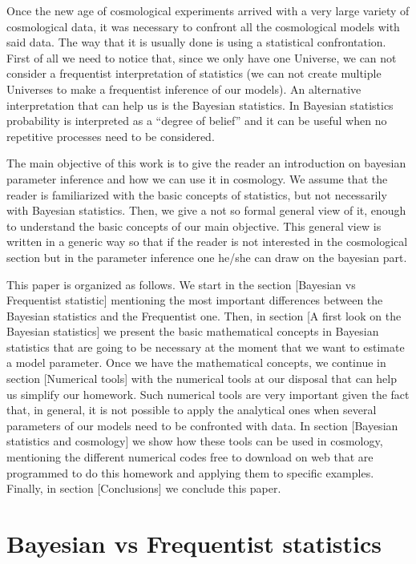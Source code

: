 \documentclass[onecolumn,           %
               showpacs,            %
               preprintnumbers,     %
               aps,                 %
               prl,          	    %
               letterpaper,             %
               superscriptaddress,      %
               nofootinbib,         %
               tightenlines,        %
               floats,floatfix      %
               ,usenatbib,
               ]{revtex4-1}
\begin{document}
Once the new age of cosmological experiments arrived with a very large variety of cosmological data, it was necessary to confront all the cosmological models with said data. The way that it is usually done is using a statistical confrontation. First of all we need to notice that, since we only have one Universe, we can not consider a frequentist interpretation of statistics (we can not create multiple Universes to make a frequentist inference of our models). An alternative interpretation that can help us is the Bayesian statistics. In Bayesian statistics probability is interpreted as a ``degree of belief'' and it can be useful when no repetitive processes need to be considered.  

The main objective of this work is to give the reader an introduction on bayesian parameter inference and how we can use it in cosmology. We assume that the reader is familiarized with the basic concepts of statistics, but not necessarily with Bayesian statistics. Then, we give a not so formal general view of it, enough to understand the basic concepts of our main objective. This general view is written in a generic way so that if the reader is not interested in the cosmological section but in the parameter inference one he/she can draw on the bayesian part.  

This paper is organized as follows. We start in the section [Bayesian vs Frequentist statistic] mentioning the most important differences between the Bayesian statistics and the Frequentist one. Then, in section [A first look on the Bayesian statistics] we present the basic mathematical concepts in Bayesian statistics that are going to be necessary at the moment that we want to estimate a model parameter. Once we have the mathematical concepts, we continue in section [Numerical tools] with the numerical tools at our disposal that can help us simplify our homework. Such numerical tools are very important given the fact that, in general, it is not possible to apply the analytical ones when several parameters of our models need to be confronted with data. In section [Bayesian statistics and cosmology] we show how these tools can be used in cosmology, mentioning the different numerical codes free to download on web that are programmed to do this homework and applying them to specific examples. Finally, in section [Conclusions] we conclude this paper.

\section{Bayesian vs Frequentist statistics}
\end{document}
